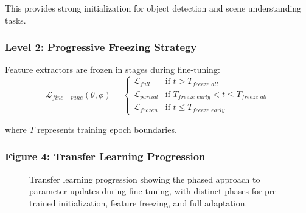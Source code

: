 \documentclass[10pt,a4paper,twocolumn]{article}
\begin{document}
This provides strong initialization for object detection and scene understanding tasks.

\subsubsection*{Level 2: Progressive Freezing Strategy}

Feature extractors are frozen in stages during fine-tuning:
\begin{equation}
    \mathcal{L}_{fine-tune}(\theta,\phi) = 
    \begin{cases}
        \mathcal{L}_{full} & \text{if } t > T_{freeze\_all}\\
        \mathcal{L}_{partial} & \text{if } T_{freeze\_early} < t \le T_{freeze\_all}\\
        \mathcal{L}_{frozen} & \text{if } t \le T_{freeze\_early}
    \end{cases}
\end{equation}

where $T$ represents training epoch boundaries.

\subsubsection*{Figure 4: Transfer Learning Progression}

\begin{figure}[h]
    \centering
    \caption{Transfer learning progression showing the phased approach to parameter updates during fine-tuning, with distinct phases for pre-trained initialization, feature freezing, and full adaptation.}
    \label{fig:transfer_progression}
\end{figure}
\end{document}
